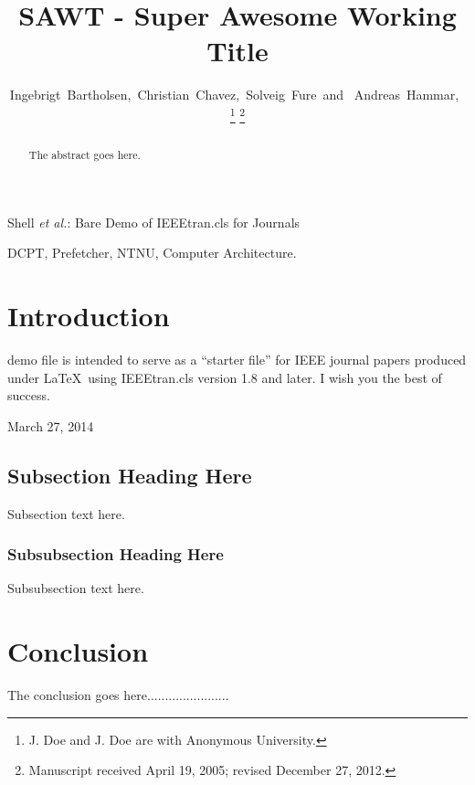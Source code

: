 \documentclass[journal]{IEEEtran}
\begin{document}
\title{SAWT - Super Awesome Working Title}

\author{Ingebrigt~Bartholsen,~Christian~Chavez,~Solveig~Fure~and ~Andreas~Hammar,~


\thanks{J. Doe and J. Doe are with Anonymous University.}
\thanks{Manuscript received April 19, 2005; revised December 27, 2012.}}

%
{Shell \MakeLowercase{\textit{et al.}}: Bare Demo of IEEEtran.cls for Journals}


\maketitle

\begin{abstract}
The abstract goes here.
\end{abstract}

\begin{IEEEkeywords}
DCPT, Prefetcher, NTNU, Computer Architecture.
\end{IEEEkeywords}
\IEEEpeerreviewmaketitle


\section{Introduction}
 demo file is intended to serve as a ``starter file''
for IEEE journal papers produced under \LaTeX\ using
IEEEtran.cls version 1.8 and later. I wish you the best of success.

\hfill March 27, 2014


\subsection{Subsection Heading Here}
Subsection text here.


\subsubsection{Subsubsection Heading Here}
Subsubsection text here.


\section{Conclusion}
The conclusion goes here.......................
\end{document}
